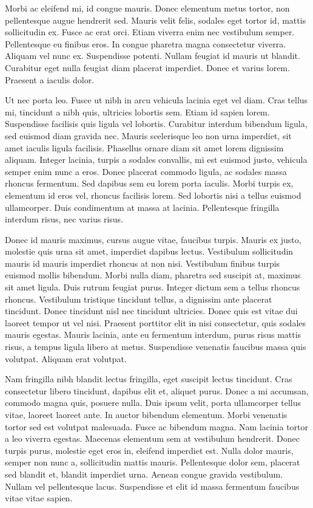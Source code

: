 \documentclass[a4paper,12pt]{article}
\begin{document}
	Morbi ac eleifend mi, id congue mauris. Donec elementum metus tortor, non pellentesque augue hendrerit sed. Mauris velit felis, sodales eget tortor id, mattis sollicitudin ex. Fusce ac erat orci. Etiam viverra enim nec vestibulum semper. Pellentesque eu finibus eros. In congue pharetra magna consectetur viverra. Aliquam vel nunc ex. Suspendisse potenti. Nullam feugiat id mauris ut blandit. Curabitur eget nulla feugiat diam placerat imperdiet. Donec et varius lorem. Praesent a iaculis dolor.

	Ut nec porta leo. Fusce ut nibh in arcu vehicula lacinia eget vel diam. Cras tellus mi, tincidunt a nibh quis, ultricies lobortis sem. Etiam id sapien lorem. Suspendisse facilisis quis ligula vel lobortis. Curabitur interdum bibendum ligula, sed euismod diam gravida nec. Mauris scelerisque leo non urna imperdiet, sit amet iaculis ligula facilisis. Phasellus ornare diam sit amet lorem dignissim aliquam. Integer lacinia, turpis a sodales convallis, mi est euismod justo, vehicula semper enim nunc a eros. Donec placerat commodo ligula, ac sodales massa rhoncus fermentum. Sed dapibus sem eu lorem porta iaculis. Morbi turpis ex, elementum id eros vel, rhoncus facilisis lorem. Sed lobortis nisi a tellus euismod ullamcorper. Duis condimentum at massa at lacinia. Pellentesque fringilla interdum risus, nec varius risus.

	Donec id mauris maximus, cursus augue vitae, faucibus turpis. Mauris ex justo, molestie quis urna sit amet, imperdiet dapibus lectus. Vestibulum sollicitudin mauris id mauris imperdiet rhoncus at non nisi. Vestibulum finibus turpis euismod mollis bibendum. Morbi nulla diam, pharetra sed suscipit at, maximus sit amet ligula. Duis rutrum feugiat purus. Integer dictum sem a tellus rhoncus rhoncus. Vestibulum tristique tincidunt tellus, a dignissim ante placerat tincidunt. Donec tincidunt nisl nec tincidunt ultricies. Donec quis est vitae dui laoreet tempor ut vel nisi. Praesent porttitor elit in nisi consectetur, quis sodales mauris egestas. Mauris lacinia, ante eu fermentum interdum, purus risus mattis risus, a tempus ligula libero at metus. Suspendisse venenatis faucibus massa quis volutpat. Aliquam erat volutpat.

	Nam fringilla nibh blandit lectus fringilla, eget suscipit lectus tincidunt. Cras consectetur libero tincidunt, dapibus elit et, aliquet purus. Donec a mi accumsan, commodo magna quis, posuere nulla. Duis ipsum velit, porta ullamcorper tellus vitae, laoreet laoreet ante. In auctor bibendum elementum. Morbi venenatis tortor sed est volutpat malesuada. Fusce ac bibendum magna. Nam lacinia tortor a leo viverra egestas. Maecenas elementum sem at vestibulum hendrerit. Donec turpis purus, molestie eget eros in, eleifend imperdiet est. Nulla dolor mauris, semper non nunc a, sollicitudin mattis mauris. Pellentesque dolor sem, placerat sed blandit et, blandit imperdiet urna. Aenean congue gravida vestibulum. Nullam vel pellentesque lacus. Suspendisse et elit id massa fermentum faucibus vitae vitae sapien.
\end{document}
